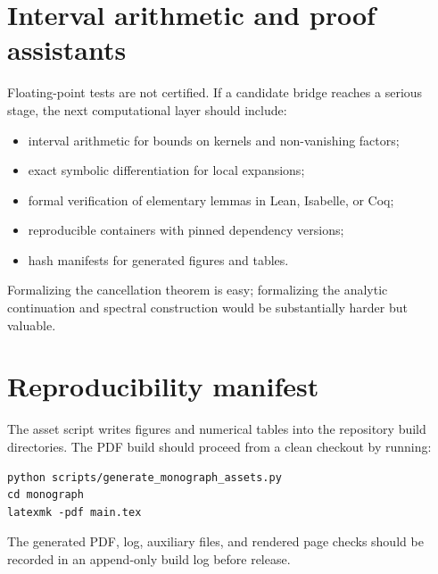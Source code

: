 \section{Interval arithmetic and proof assistants}

Floating-point tests are not certified. If a candidate bridge reaches a serious stage, the next computational layer should include:
\begin{itemize}
  \item interval arithmetic for bounds on kernels and non-vanishing factors;
  \item exact symbolic differentiation for local expansions;
  \item formal verification of elementary lemmas in Lean, Isabelle, or Coq;
  \item reproducible containers with pinned dependency versions;
  \item hash manifests for generated figures and tables.
\end{itemize}
Formalizing the cancellation theorem is easy; formalizing the analytic continuation and spectral construction would be substantially harder but valuable.

\section{Reproducibility manifest}

The asset script writes figures and numerical tables into the repository build directories. The PDF build should proceed from a clean checkout by running:
\begin{verbatim}
python scripts/generate_monograph_assets.py
cd monograph
latexmk -pdf main.tex
\end{verbatim}
The generated PDF, log, auxiliary files, and rendered page checks should be recorded in an append-only build log before release.

